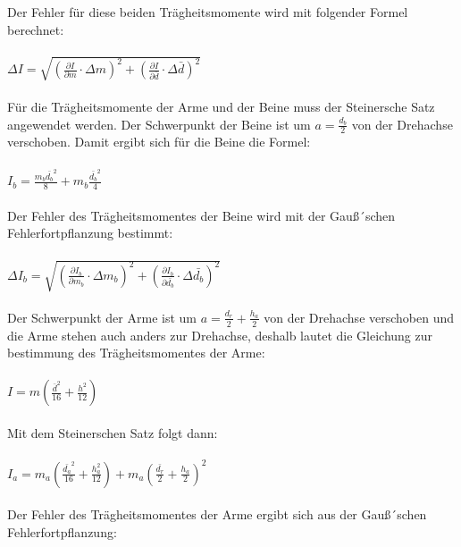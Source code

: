 Der Fehler für diese beiden Trägheitsmomente wird mit folgender Formel berechnet:\\\\

$\Delta I = \sqrt{\left(\frac{\partial I}{\partial m} \cdot \Delta m \right)^2
  + \left(\frac{\partial I}{\partial \bar{d}} \cdot \Delta \bar{d} \right)^2}$\\\\

Für die Trägheitsmomente der Arme und der Beine muss der Steinersche Satz angewendet
werden. Der Schwerpunkt der Beine ist um $a = \frac{d_b}{2}$ von der Drehachse verschoben.
Damit ergibt sich für die Beine die Formel:\\\\

$I_b = \frac{m_b \bar{d_b}^2}{8} + m_b \frac{\bar{d_b}^2}{4}$\\\\

Der Fehler des Trägheitsmomentes der Beine wird mit der Gauß´schen Fehlerfortpflanzung
bestimmt: \\\\

$\Delta I_b = \sqrt{\left(\frac{\partial I_b}{\partial m_b} \cdot \Delta m_b \right)^2
  + \left(\frac{\partial I_b}{\partial \bar{d_b}} \cdot \Delta \bar{d_b} \right)^2}$\\\\

Der Schwerpunkt der Arme ist um $a = \frac{d_r}{2} + \frac{h_a}{2}$ von der Drehachse verschoben
und die Arme stehen auch anders zur Drehachse, deshalb lautet die Gleichung zur
bestimmung des Trägheitsmomentes der Arme: \\\\

$I = m \left( \frac{\bar{d}^2}{16} + \frac{h^2}{12} \right)$\\\\

Mit dem Steinerschen Satz folgt dann:\\\\

$I_a = m_a \left( \frac{\bar{d_a}^2}{16} + \frac{h_a^2}{12} \right)
+ m_a \left(\frac{\bar{d_r}}{2} + \frac{h_a}{2}\right)^2$ \\\\

Der Fehler des Trägheitsmomentes der Arme ergibt sich aus der Gauß´schen
Fehlerfortpflanzung: \\\\


